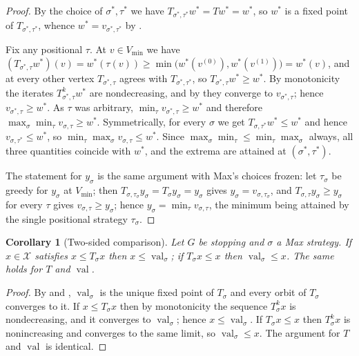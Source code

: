 \documentclass[11pt]{article}
\theoremstyle{plain}
\newtheorem{corollary}[theorem]{Corollary}
\theoremstyle{definition}
\DeclareMathOperator{\val}{val}
\newcommand{\Vmin}{V_{\min}}
\begin{document}
\begin{proof}
By the choice of $\sigma^\ast,\tau^\ast$ we have
$T_{\sigma^\ast,\tau^\ast}w^\ast=Tw^\ast=w^\ast$, so $w^\ast$ is a fixed
point of $T_{\sigma^\ast,\tau^\ast}$, whence
$w^\ast=v_{\sigma^\ast,\tau^\ast}$ by .

Fix any positional $\tau$. At $v\in\Vmin$ we have
$(T_{\sigma^\ast,\tau}w^\ast)(v)=w^\ast(\tau(v))\ge\min\bigl(w^\ast(v^{(0)}),w^\ast(v^{(1)})\bigr)=w^\ast(v)$,
and at every other vertex $T_{\sigma^\ast,\tau}$ agrees with
$T_{\sigma^\ast,\tau^\ast}$, so $T_{\sigma^\ast,\tau}w^\ast\ge w^\ast$.
By monotonicity the iterates $T_{\sigma^\ast,\tau}^{k}w^\ast$ are
nondecreasing, and by  they converge to
$v_{\sigma^\ast,\tau}$; hence $v_{\sigma^\ast,\tau}\ge w^\ast$. As $\tau$
was arbitrary, $\min_\tau v_{\sigma^\ast,\tau}\ge w^\ast$ and therefore
$\max_\sigma\min_\tau v_{\sigma,\tau}\ge w^\ast$. Symmetrically, for
every $\sigma$ we get $T_{\sigma,\tau^\ast}w^\ast\le w^\ast$ and hence
$v_{\sigma,\tau^\ast}\le w^\ast$, so
$\min_\tau\max_\sigma v_{\sigma,\tau}\le w^\ast$. Since
$\max_\sigma\min_\tau\le\min_\tau\max_\sigma$ always, all three
quantities coincide with $w^\ast$, and the extrema are attained at
$(\sigma^\ast,\tau^\ast)$.

The statement for $y_\sigma$ is the same argument with Max's choices
frozen: let $\tau_\sigma$ be greedy for $y_\sigma$ at $\Vmin$; then
$T_{\sigma,\tau_\sigma}y_\sigma=T_\sigma y_\sigma=y_\sigma$ gives
$y_\sigma=v_{\sigma,\tau_\sigma}$, and $T_{\sigma,\tau}y_\sigma\ge y_\sigma$
for every $\tau$ gives $v_{\sigma,\tau}\ge y_\sigma$; hence
$y_\sigma=\min_\tau v_{\sigma,\tau}$, the minimum being attained by the
single positional strategy $\tau_\sigma$.
\end{proof}

\begin{corollary}[Two-sided comparison]\label{cor:comparison}
Let $G$ be stopping and $\sigma$ a Max strategy. If $x\in\mathcal{X}$
satisfies $x\le T_\sigma x$ then $x\le\val_\sigma$; if
$T_\sigma x\le x$ then $\val_\sigma\le x$. The same holds for $T$ and
$\val$.
\end{corollary}

\begin{proof}
By  and ,
$\val_\sigma$ is the unique fixed point of $T_\sigma$ and every orbit of
$T_\sigma$ converges to it. If $x\le T_\sigma x$ then by monotonicity the
sequence $T_\sigma^{k}x$ is nondecreasing, and it converges to
$\val_\sigma$; hence $x\le\val_\sigma$. If $T_\sigma x\le x$ then
$T_\sigma^{k}x$ is nonincreasing and converges to the same limit, so
$\val_\sigma\le x$. The argument for $T$ and $\val$ is identical.
\end{proof}
\end{document}
